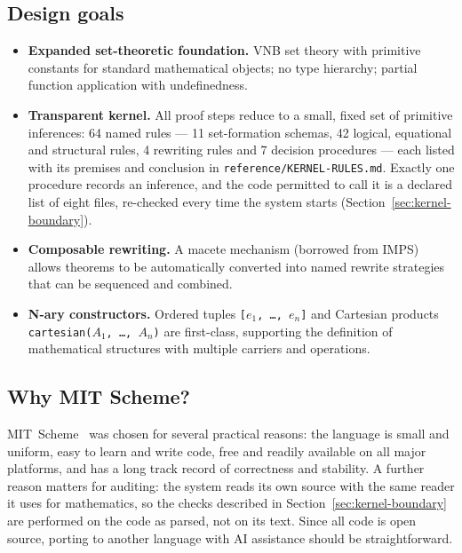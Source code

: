 \subsection{Design goals}

\begin{itemize}
\item \textbf{Expanded set-theoretic foundation.}  VNB set theory with
  primitive constants for standard mathematical objects; no type
  hierarchy; partial function application with undefinedness.
\item \textbf{Transparent kernel.}  All proof steps reduce to a small,
  fixed set of primitive inferences: 64 named rules --- 11
  set-formation schemas, 42 logical, equational and structural rules, 4
  rewriting rules and 7 decision procedures --- each listed with its
  premises and conclusion in \texttt{reference/KERNEL-RULES.md}.
  Exactly one procedure records an inference, and the code permitted to
  call it is a declared list of eight files, re-checked every time the
  system starts (Section~\ref{sec:kernel-boundary}).
\item \textbf{Composable rewriting.}  A macete mechanism (borrowed from
  IMPS) allows theorems to be automatically converted into named rewrite
  strategies that can be sequenced and combined.
\item \textbf{N-ary constructors.}  Ordered tuples \texttt{[$e_1$,
  \ldots, $e_n$]} and Cartesian products \texttt{cartesian($A_1$, \ldots,
  $A_n$)} are first-class, supporting the definition of mathematical
  structures with multiple carriers and operations.
\end{itemize}

\subsection{Why MIT Scheme?}

MIT~Scheme~\cite{MITScheme} was chosen for several practical reasons: the language is
small and uniform, easy to learn and write code, free and readily
available on all major platforms, and has a long track record of
correctness and stability.  A further reason matters for auditing: the
system reads its own source with the same reader it uses for
mathematics, so the checks described in
Section~\ref{sec:kernel-boundary} are performed on the code as parsed,
not on its text.  Since all code is
open source, porting to another language with AI assistance should be
straightforward.


